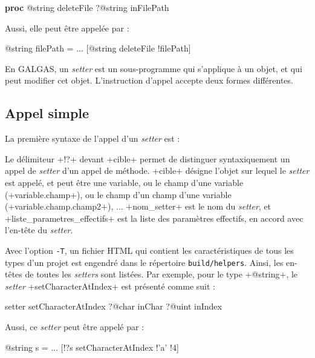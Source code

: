 {\noindent\ttfamily
\textbf{proc} @string deleteFile ?@string inFilePath\\
}

Aussi, elle peut être appelée par :
\begin{galgas}
@string filePath = ...
[@string deleteFile !filePath]
\end{galgas}











En GALGAS, un \emph{setter} est un sous-programme qui s'applique à un objet, et qui peut modifier cet objet. L'instruction d'appel accepte deux formes différentes.

\subsection{Appel simple}

La première syntaxe de l'appel d'un  \emph{setter} est :
\begin{galgas}
\end{galgas}

Le délimiteur \ggs+!?+  devant \ggs+cible+ permet de distinguer syntaxiquement un appel de \emph{setter} d'un appel de méthode. \ggs+cible+ désigne l'objet sur lequel le \emph{setter} est appelé, et peut être une variable, ou le champ d'une variable (\ggs+variable.champ+), ou le champ d'un champ d'une variable (\ggs+variable.champ.champ2+), ... \ggs+nom_setter+ est le nom du \emph{setter}, et \ggs+liste_parametres_effectifs+ est la liste des paramètres effectifs, en accord avec l'en-tête du \emph{setter}.

Avec l'option \texttt{-T}, un fichier HTML qui contient les caractéristiques de tous les types d'un projet est engendré dans le répertoire \texttt{build/helpers}. Ainsi, les en-têtes de toutes les \emph{setters} sont listées. Par exemple, pour le type \ggs+@string+, le \emph{setter} \ggs+setCharacterAtIndex+ est présenté comme suit :

\begin{galgas}
setter setCharacterAtIndex
  ?@char inChar
  ?@uint inIndex
\end{galgas}

Aussi, ce \emph{setter} peut être appelé par :
\begin{galgas}
@string s = ...
[!?s setCharacterAtIndex !'a' !4]
\end{galgas}


